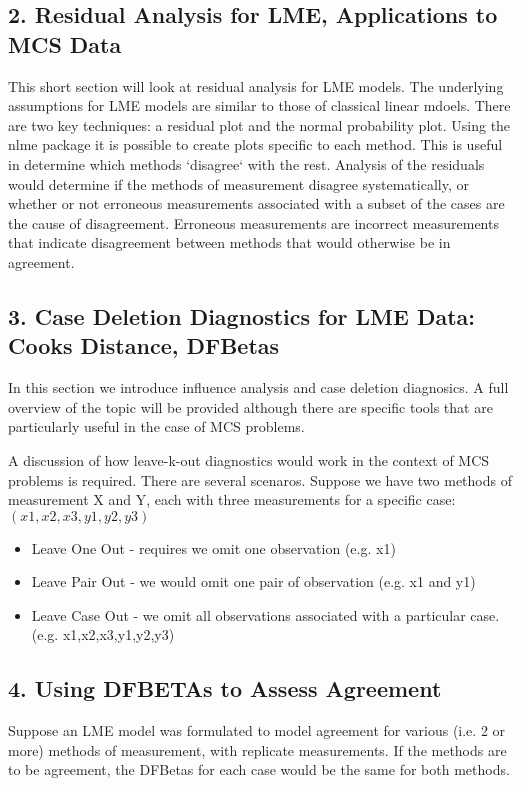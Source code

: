 \documentclass[Main.tex]{subfiles}
\begin{document}
\subsection*{2. Residual Analysis for LME, Applications to MCS Data}

This short section will look at residual analysis for LME models. The underlying assumptions for LME models are similar to those of classical linear mdoels. There are two key techniques: a residual plot and the normal probability plot. Using the nlme package it is possible to create plots specific to each method. This is useful in determine which methods `disagree` with the rest.
Analysis of the residuals would determine if the methods of measurement disagree systematically, or whether or not erroneous measurements associated with a subset of the cases are the cause of disagreement.
Erroneous measurements are incorrect measurements that indicate disagreement between methods that would otherwise be in agreement.
\subsection*{3. Case Deletion Diagnostics for LME Data: Cooks Distance, DFBetas}
In this section we introduce influence analysis and case deletion diagnosics. A full overview of the topic will be provided although there are specific tools that are particularly useful in the case of MCS problems.

A discussion of how leave-k-out diagnostics would work in the context of MCS problems is required. There are several scenaros. Suppose we have two methods of measurement X and Y, each with three measurements for a specific case: $(x1,x2,x3,y1,y2,y3)$

\begin{itemize}
\item Leave One Out - requires we omit one observation (e.g. x1)
\item Leave Pair Out - we would omit one pair of observation (e.g. x1 and y1)
\item Leave Case Out - we omit all observations associated with a particular case. (e.g. x1,x2,x3,y1,y2,y3)
\end{itemize}
\subsection*{4. Using DFBETAs to Assess Agreement}
Suppose an LME model was formulated to model agreement for various (i.e. 2 or more) methods of measurement, with replicate measurements. If the methods are to be agreement, the DFBetas for each case would be the same for both methods.
\end{document}
